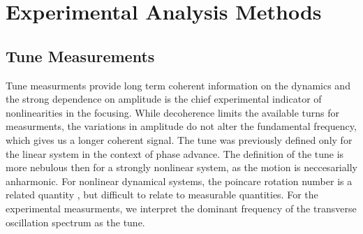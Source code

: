 \chapter{Experimental Analysis Methods} \label{chap:analysis}

\section{Tune Measurements} \label{sec:tune}
Tune measurments provide long term coherent information on the dynamics and the strong dependence on amplitude is the chief experimental indicator of nonlinearities in the focusing. While decoherence limits the available turns for measurments, the variations in amplitude do not alter the fundamental frequency, which gives us a longer coherent signal. The tune was previously defined only for the linear system in the context of phase advance. The definition of the tune is more nebulous then for a strongly nonlinear system, as the motion is neccesarially anharmonic. For nonlinear dynamical systems, the poincare rotation number is a related quantity \cite{nagaitsevBetatron}, but difficult to relate to measurable quantities. For the experimental measurments, we interpret the dominant frequency of the transverse oscillation spectrum as the tune. 


